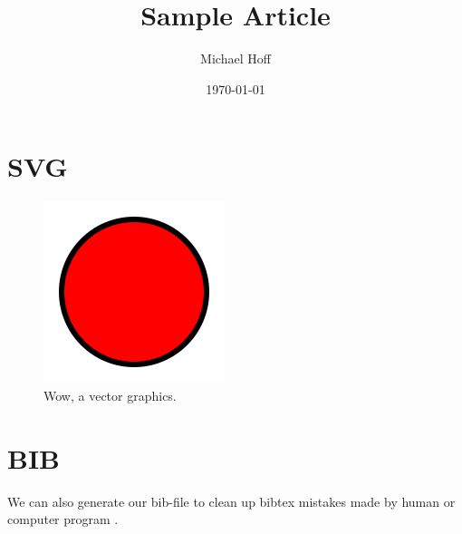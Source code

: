\documentclass[a4paper]{article}
\title{Sample Article}
\author{Michael Hoff}
\date{\today}
\begin{document}
\maketitle

\section{SVG}

\lipsum[1]

\begin{figure}[h!]
    \begin{center}
        \includegraphics{fig/circle}
        \caption{Wow, a vector graphics.}
    \end{center}
\end{figure}

\section{BIB}

We can also generate our bib-file to clean up
bibtex mistakes made by human or computer program
\cite{Lee2016}.


\end{document}
